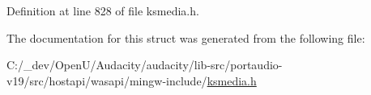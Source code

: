 Definition at line 828 of file ksmedia.\+h.



The documentation for this struct was generated from the following file\+:\begin{DoxyCompactItemize}
\item 
C\+:/\+\_\+dev/\+Open\+U/\+Audacity/audacity/lib-\/src/portaudio-\/v19/src/hostapi/wasapi/mingw-\/include/\hyperlink{ksmedia_8h}{ksmedia.\+h}\end{DoxyCompactItemize}

